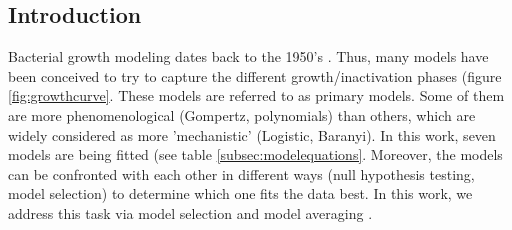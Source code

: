 \documentclass[titlepage,11pt]{article}
\begin{document}
	\begin{linenumbers}
		\section{Introduction}\label{sec:introduction}
		Bacterial growth modeling dates back to the 1950's \cite{Schaechter2015}. Thus, many models have been conceived to try to capture the different growth/inactivation phases (figure \ref{fig:growthcurve}. These models are referred to as primary models. Some of them are more phenomenological (Gompertz, polynomials) than others, which are widely considered as more 'mechanistic' (Logistic, Baranyi). In this work, seven models are being fitted (see table \ref{subsec:modelequations}. Moreover, the models can be confronted with each other in different ways (null hypothesis testing, model selection) to determine which one fits the data best. In this work, we address this task via model selection and model averaging \cite{Anderson2002, Johnson2004}. \\
			

\end{linenumbers}
\end{document}
